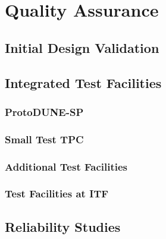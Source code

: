 \section{Quality Assurance}
\label{sec:fdsp-tpcelec-qa}

\subsection{Initial Design Validation}
\label{sec:fdsp-tpcelec-qa-initial}

\subsection{Integrated Test Facilities}
\label{sec:fdsp-tpcelec-qa-integrated}

\subsubsection{ProtoDUNE-SP}
\label{sec:fdsp-tpcelec-qa-integrated-pdune}

\subsubsection{Small Test TPC}
\label{sec:fdsp-tpcelec-qa-integrated-testtpc}

\subsubsection{Additional Test Facilities}
\label{sec:fdsp-tpcelec-qa-integrated-additional}

\subsubsection{Test Facilities at ITF}
\label{sec:fdsp-tpcelec-qa-integrated-itf}

\subsection{Reliability Studies}
\label{sec:fdsp-tpcelec-qa-reliability}
